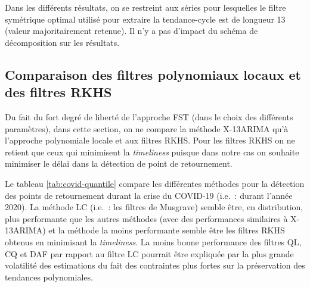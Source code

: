\documentclass[
  11pt,
  french,
  a4paper]{article}
\newcommand\1{\mathds{1}}
\begin{document}
Dans les différents résultats, on se restreint aux séries pour lesquelles le filtre symétrique optimal utilisé pour extraire la tendance-cycle est de longueur 13 (valeur majoritairement retenue).
Il n'y a pas d'impact du schéma de décomposition sur les résultats.

\hypertarget{comparaison-des-filtres-polynomiaux-locaux-et-des-filtres-rkhs}{%
\subsection{Comparaison des filtres polynomiaux locaux et des filtres RKHS}\label{comparaison-des-filtres-polynomiaux-locaux-et-des-filtres-rkhs}}

Du fait du fort degré de liberté de l'approche FST (dans le choix des différents paramètres), dans cette section, on ne compare la méthode X-13ARIMA qu'à l'approche polynomiale locale et aux filtres RKHS.
Pour les filtres RKHS on ne retient que ceux qui minimisent la \emph{timeliness} puisque dans notre cas on souhaite minimiser le délai dans la détection de point de retournement.

Le tableau \ref{tab:covid-quantile} compare les différentes méthodes pour la détection des points de retournement durant la crise du COVID-19 (i.e.~: durant l'année 2020).
La méthode LC (i.e.~: les filtres de Musgrave) semble être, en distribution, plus performante que les autres méthodes (avec des performances similaires à X-13ARIMA) et la méthode la moins performante semble être les filtres RKHS obtenus en minimisant la \emph{timeliness}.
La moins bonne performance des filtres QL, CQ et DAF par rapport au filtre LC pourrait être expliquée par la plus grande volatilité des estimations du fait des contraintes plus fortes sur la préservation des tendances polynomiales.
\end{document}
